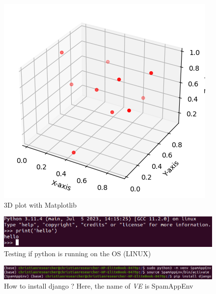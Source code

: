 \documentclass[12pt,a4paper, oneside]{book}
\begin{document}
\begin{figure}[h]
	\centering
	\includegraphics[width=0.7\linewidth]{3Ddimension}
	\caption{3D plot with Matplotlib}
	\label{fig:3ddimensionPlotlib}
\end{figure}  

 \begin{figure}[h]
	\centering
	\includegraphics[width=1\linewidth]{testPython}
	\caption{Testing if python is running on the OS (LINUX)}
	\label{fig:testpython}
\end{figure}

\begin{figure}[h]
	\centering
	\includegraphics[width=1\linewidth]{installDjango}
	\caption{How to install django ? Here, the name of \textit{VE} is SpamAppEnv}
	\label{fig:installdjango}
\end{figure}
\end{document}
